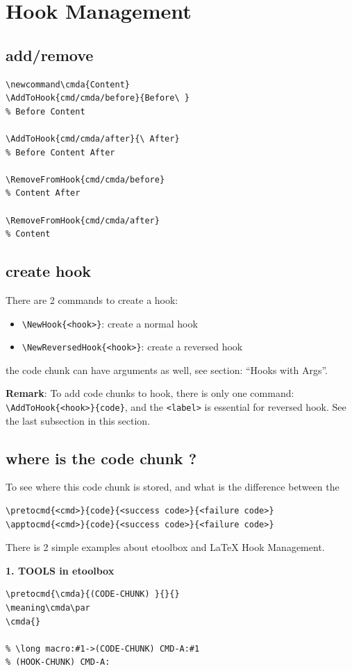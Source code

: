 \documentclass{article}
\newcommand\cmda{Content}
\begin{document}
\tableofcontents
\newpage

\section{Hook Management}
\subsection{add/remove}
\begin{lstlisting}
\newcommand\cmda{Content}
\AddToHook{cmd/cmda/before}{Before\ }
% Before Content

\AddToHook{cmd/cmda/after}{\ After}
% Before Content After

\RemoveFromHook{cmd/cmda/before}
% Content After

\RemoveFromHook{cmd/cmda/after}
% Content
\end{lstlisting}

\subsection{create hook}
There are 2 commands to create a hook:
\begin{itemize}
  \item \verb|\NewHook{<hook>}|: create a normal hook
  \item \verb|\NewReversedHook{<hook>}|: create a reversed hook
\end{itemize}

the code chunk can have arguments as well, see section: ``Hooks with Args''.

\textbf{Remark}: To add code chunks to hook, there is only one command: \verb|\AddToHook{<hook>}{code}|, 
and the \verb|<label>| is essential for reversed hook. See the last subsection in this section.


\subsection{where is the code chunk ?}
To see where this code chunk is stored, and what is the difference
between the
\begin{lstlisting}
\pretocmd{<cmd>}{code}{<success code>}{<failure code>}
\apptocmd{<cmd>}{code}{<success code>}{<failure code>}
\end{lstlisting}

There is 2 simple examples about etoolbox and \LaTeX{} Hook Management.

\textbf{1. TOOLS in etoolbox}
\begin{lstlisting}
\pretocmd{\cmda}{(CODE-CHUNK) }{}{}
\meaning\cmda\par
\cmda{}

% \long macro:#1->(CODE-CHUNK) CMD-A:#1
% (HOOK-CHUNK) CMD-A:
\end{lstlisting}
\end{document}
